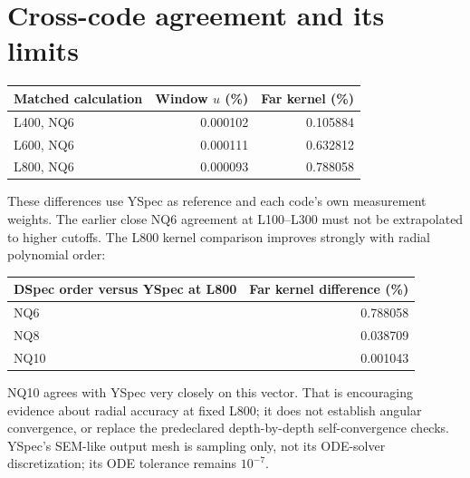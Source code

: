 \documentclass[11pt,a4paper]{article}
\begin{document}
\section{Cross-code agreement and its limits}
\begin{center}\small\begin{tabular}{lrr}\toprule
Matched calculation & Window $u$ (\%) & Far kernel (\%)\\\midrule
L400, NQ6 & 0.000102 & 0.105884 \\
L600, NQ6 & 0.000111 & 0.632812 \\
L800, NQ6 & 0.000093 & 0.788058 \\
\bottomrule\end{tabular}\end{center}
These differences use YSpec as reference and each code's own measurement weights. The earlier close NQ6 agreement at L100--L300 must not be extrapolated to higher cutoffs. The L800 kernel comparison improves strongly with radial polynomial order:
\begin{center}\small\begin{tabular}{lr}\toprule
DSpec order versus YSpec at L800 & Far kernel difference (\%)\\\midrule
NQ6 & 0.788058 \\
NQ8 & 0.038709 \\
NQ10 & 0.001043 \\
\bottomrule\end{tabular}\end{center}
NQ10 agrees with YSpec very closely on this vector. That is encouraging evidence about radial accuracy at fixed L800; it does not establish angular convergence, or replace the predeclared depth-by-depth self-convergence checks. YSpec's SEM-like output mesh is sampling only, not its ODE-solver discretization; its ODE tolerance remains $10^{-7}$.

\newpage
\end{document}
